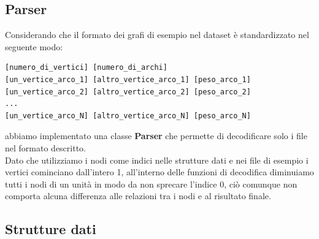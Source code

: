 \documentclass[]{article}
\begin{document}
\subsection{Parser}
Considerando che il formato dei grafi di esempio nel dataset è standardizzato nel seguente modo:
\begin{verbatim}
[numero_di_vertici] [numero_di_archi] 
[un_vertice_arco_1] [altro_vertice_arco_1] [peso_arco_1] 
[un_vertice_arco_2] [altro_vertice_arco_2] [peso_arco_2] 
... 
[un_vertice_arco_N] [altro_vertice_arco_N] [peso_arco_N]
\end{verbatim}
abbiamo implementato una classe \textbf{Parser} che permette di decodificare solo i file nel formato descritto.\\
Dato che utilizziamo i nodi come indici nelle strutture dati e nei file di esempio i vertici cominciano dall'intero 1, all'interno delle funzioni di decodifica diminuiamo tutti i nodi di un unità in modo da non sprecare l'indice 0, ciò comunque non comporta alcuna differenza alle relazioni tra i nodi e al risultato finale.
\subsection{Strutture dati}
\end{document}
